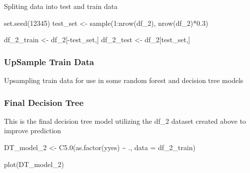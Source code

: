 \documentclass[
]{article}
\newenvironment{Shaded}{\begin{snugshade}}{\end{snugshade}}
\newcommand{\AttributeTok}[1]{\textcolor[rgb]{0.77,0.63,0.00}{#1}}
\newcommand{\DecValTok}[1]{\textcolor[rgb]{0.00,0.00,0.81}{#1}}
\newcommand{\FloatTok}[1]{\textcolor[rgb]{0.00,0.00,0.81}{#1}}
\newcommand{\FunctionTok}[1]{\textcolor[rgb]{0.00,0.00,0.00}{#1}}
\newcommand{\NormalTok}[1]{#1}
\newcommand{\OtherTok}[1]{\textcolor[rgb]{0.56,0.35,0.01}{#1}}
\newcommand{\SpecialCharTok}[1]{\textcolor[rgb]{0.00,0.00,0.00}{#1}}
\newcommand{\StringTok}[1]{\textcolor[rgb]{0.31,0.60,0.02}{#1}}
\begin{document}
Spliting data into test and train data

\begin{Shaded}
\begin{Highlighting}[]
\FunctionTok{set.seed}\NormalTok{(}\DecValTok{12345}\NormalTok{)}
\NormalTok{test\_set }\OtherTok{\textless{}{-}} \FunctionTok{sample}\NormalTok{(}\DecValTok{1}\SpecialCharTok{:}\FunctionTok{nrow}\NormalTok{(df\_2), }\FunctionTok{nrow}\NormalTok{(df\_2)}\SpecialCharTok{*}\FloatTok{0.3}\NormalTok{) }

\NormalTok{df\_2\_train }\OtherTok{\textless{}{-}}\NormalTok{ df\_2[}\SpecialCharTok{{-}}\NormalTok{test\_set,]}
\NormalTok{df\_2\_test  }\OtherTok{\textless{}{-}}\NormalTok{ df\_2[test\_set,]}
\end{Highlighting}
\end{Shaded}

\hypertarget{upsample-train-data}{%
\subsubsection{UpSample Train Data}\label{upsample-train-data}}

Upsampling train data for use in some random forest and decision tree
models

\begin{Shaded}
\end{Shaded}

\hypertarget{final-decision-tree}{%
\subsubsection{Final Decision Tree}\label{final-decision-tree}}

This is the final decision tree model utilizing the df\_2 dataset
created above to improve prediction

\begin{Shaded}
\begin{Highlighting}[]
\NormalTok{DT\_model\_2 }\OtherTok{\textless{}{-}} \FunctionTok{C5.0}\NormalTok{(}\FunctionTok{as.factor}\NormalTok{(yyes) }\SpecialCharTok{\textasciitilde{}}\NormalTok{ ., }\AttributeTok{data =}\NormalTok{ df\_2\_train)}

\FunctionTok{plot}\NormalTok{(DT\_model\_2)}
\end{Highlighting}
\end{Shaded}
\end{document}

